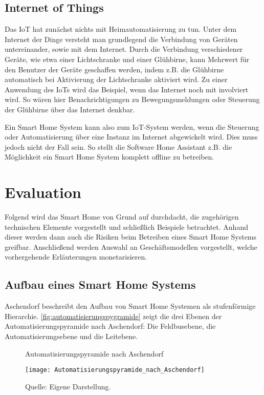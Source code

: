 \subsection{Internet of Things}

Das \ac{IoT} hat zunächst nichts mit Heimautomatisierung zu tun.
Unter dem Internet der Dinge versteht man grundlegend die Verbindung von Geräten untereinander, sowie mit dem Internet.
Durch die Verbindung verschiedener Geräte, wie etwa einer Lichtschranke und einer Glühbirne, kann Mehrwert für den Benutzer der Geräte geschaffen werden, indem z.B. die Glühbirne automatisch bei Aktivierung der Lichtschranke aktiviert wird.
Zu einer Anwendung des \acp{IoT} wird das Beispiel, wenn das Internet noch mit involviert wird.
So wären hier Benachrichtigungen zu Bewegungsmeldungen oder Steuerung der Glühbirne über das Internet denkbar.

Ein Smart Home System kann also zum \ac{IoT}-System werden, wenn die Steuerung oder Automatisierung über eine Instanz im Internet abgewickelt wird.
Dies muss jedoch nicht der Fall sein.
So stellt die Software Home Assistant z.B. die Möglichkeit ein Smart Home System komplett offline zu betreiben.

\section{Evaluation}

Folgend wird das Smart Home von Grund auf durchdacht, die zugehörigen technischen Elemente vorgestellt und schließlich Beispiele betrachtet.
Anhand dieser werden dann auch die Risiken beim Betreiben eines Smart Home Systems greifbar.
Anschließend werden Auswahl an Geschäftsmodellen vorgestellt, welche vorhergehende Erläuterungen monetarisieren.

\newpage

\subsection{Aufbau eines Smart Home Systems}\label{sec:aufbau}

Aschendorf beschreibt den Aufbau von Smart Home Systemen als stufenförmige Hierarchie.
\autoref{fig:automatisierungspygramide} zeigt die drei Ebenen der Automatisierungspyramide nach Aschendorf:
Die Feldbusebene, die Automatisierungsebene und die Leitebene. 

\begin{figure}[ht]
	\centering
	\caption{Automatisierungspyramide nach Aschendorf}
	\texttt{[image: Automatisierungspyramide\_nach\_Aschendorf]}
	\caption*{\footnotesize{Quelle: Eigene Darstellung.}}
	\label{fig:automatisierungspygramide}
\end{figure}

